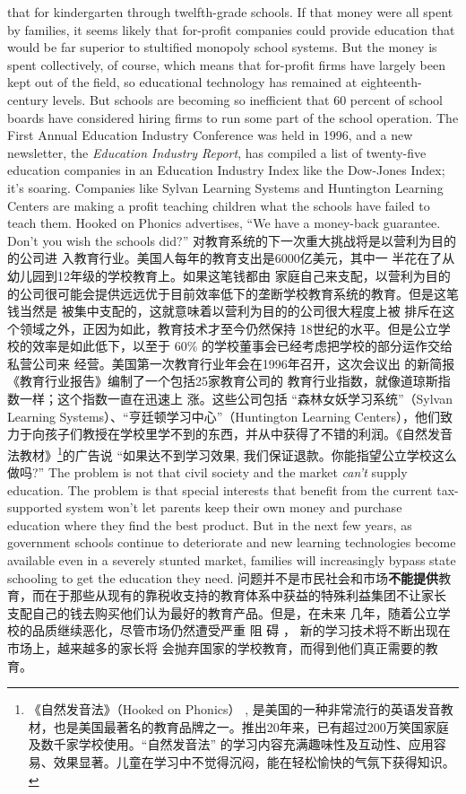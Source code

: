\begin{paracol}{2}
that for kindergarten through twelfth-grade schools. If that
money were all spent by families, it seems likely that for-profit
companies could provide education that would be far superior
to stultified monopoly school systems. But the money is spent
collectively, of course, which means that for-profit firms have
largely been kept out of the field, so educational technology has
remained at eighteenth-century levels. But schools are becoming so inefficient that 60 percent of school boards have considered hiring firms to run some part of the school operation. The
First Annual Education Industry Conference was held in 1996,
and a new newsletter, the \textit{Education Industry Report}, has compiled a list of twenty-five education companies in an Education
Industry Index like the Dow-Jones Index; it's soaring. Companies like Sylvan Learning Systems and Huntington Learning
Centers are making a profit teaching children what the schools
have failed to teach them. Hooked on Phonics advertises, ``We
have a money-back guarantee. Don't you wish the schools did?''
\switchcolumn
对教育系统的下一次重大挑战将是以营利为目的的公司进
入教育行业。美国人每年的教育支出是6000亿美元，其中一
半花在了从幼儿园到12年级的学校教育上。如果这笔钱都由
家庭自己来支配，以营利为目的的公司很可能会提供远远优于目前效率低下的垄断学校教育系统的教育。但是这笔钱当然是
被集中支配的，这就意味着以营利为目的的公司很大程度上被
排斥在这个领域之外，正因为如此，教育技术才至今仍然保持
18世纪的水平。但是公立学校的效率是如此低下，以至于
60\% 的学校董事会已经考虑把学校的部分运作交给私营公司来
经营。美国第一次教育行业年会在1996年召开，这次会议出
的新简报《教育行业报告》编制了一个包括25家教育公司的
教育行业指数，就像道琼斯指数一样；这个指数一直在迅速上
涨。这些公司包括 “森林女妖学习系统”（Sylvan  Learning Systems）、“亨廷顿学习中心”（Huntington  Learning Centers），他们致力于向孩子们教授在学校里学不到的东西，并从中获得了不错的利润。《自然发音法教材》\footnote{《自然发音法》（Hooked on Phonics） , 是美国的一种非常流行的英语发音教材，也是美国最著名的教育品牌之一。推出20年来，已有超过200万笑国家庭及数千家学校使用。“自然发音法” 的学习内容充满趣味性及互动性、应用容易、效果显著。儿童在学习中不觉得沉闷，能在轻松愉快的气氛下获得知识。}的广告说 “如果达不到学习效果, 我们保证退款。你能指望公立学校这么做吗?”
\switchcolumn*
The problem is not that civil society and the market \textit{can't}
supply education. The problem is that special interests that
benefit from the current tax-supported system won't let parents
keep their own money and purchase education where they find
the best product. But in the next few years, as government
schools continue to deteriorate and new learning technologies
become available even in a severely stunted market, families
will increasingly bypass state schooling to get the education
they need.
\switchcolumn
问题并不是市民社会和市场\textbf{不能提供}教育，而在于那些从现有的靠税收支持的教育体系中获益的特殊利益集团不让家长
支配自己的钱去购买他们认为最好的教育产品。但是，在未来
几年，随着公立学校的品质继续恶化，尽管市场仍然遭受严重
阻 碍 ， 新的学习技术将不断出现在市场上，越来越多的家长将
会抛弃国家的学校教育，而得到他们真正需要的教育。


\end{paracol}
